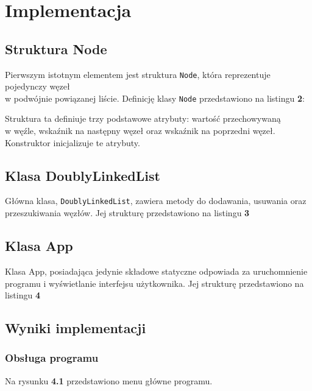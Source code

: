 \newpage
\section{Implementacja}		%

\subsection{Struktura Node}

Pierwszym istotnym elementem jest struktura \texttt{Node}, która reprezentuje pojedynczy węzeł \\
w podwójnie powiązanej liście. Definicję klasy \texttt{Node} przedstawiono na listingu \textbf{2}:



Struktura ta definiuje trzy podstawowe atrybuty: wartość przechowywaną \\ w węźle, wskaźnik na następny węzeł oraz wskaźnik na poprzedni węzeł. Konstruktor inicjalizuje te atrybuty.

\subsection{Klasa DoublyLinkedList}

Główna klasa, \texttt{DoublyLinkedList}, zawiera metody do dodawania, usuwania oraz przeszukiwania węzłów.
Jej strukturę przedstawiono na listingu \textbf{3}



\subsection{Klasa App}

Klasa App, posiadająca jedynie składowe statyczne odpowiada za uruchomnienie programu i wyświetlanie interfejsu użytkownika.
Jej strukturę przedstawiono na listingu \textbf{4}



\subsection{Wyniki implementacji}

\subsubsection{Obsługa programu}
Na rysunku \textbf{4.1} przedstawiono menu główne programu.

